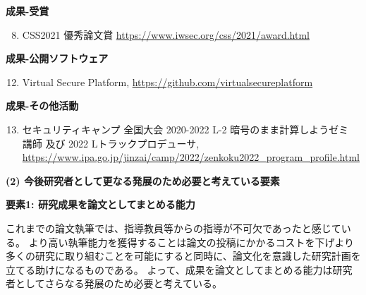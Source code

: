 \noindent\textbf{成果-受賞}
\begin{enumerate}[leftmargin=0.5cm]
    \setcounter{enumi}{7}
    \setlength{\parskip}{0cm} %
    \setlength{\itemsep}{0cm} %
	\label{achieve:mitou}
	\label{achieve:nhk}
	\label{achieve:vsp}
	\item CSS2021 優秀論文賞 \url{https://www.iwsec.org/css/2021/award.html} \label{achieve:css}
\end{enumerate}


\noindent\textbf{成果-公開ソフトウェア}
\begin{enumerate}[leftmargin=0.5cm]
    \setcounter{enumi}{11}
    \setlength{\parskip}{0cm} %
    \setlength{\itemsep}{0cm} %
	\item Virtual Secure Platform, \url{https://github.com/virtualsecureplatform}\label{code:vsp}
\end{enumerate}

\noindent\textbf{成果-その他活動}

\begin{enumerate}[leftmargin=0.5cm]
    \setcounter{enumi}{12}
	\item セキュリティキャンプ 全国大会 2020-2022 L-2 暗号のまま計算しようゼミ 講師 及び 2022 Lトラックプロデューサ, \url{https://www.ipa.go.jp/jinzai/camp/2022/zenkoku2022_program_profile.html}\label{achieve:seccamp}
\end{enumerate}

\vspace{5mm}
\noindent\textbf{(2) 今後研究者として更なる発展のため必要と考えている要素}



\noindent\textbf{要素1: 研究成果を論文としてまとめる能力}

これまでの論文執筆では、指導教員等からの指導が不可欠であったと感じている。
より高い執筆能力を獲得することは論文の投稿にかかるコストを下げより多くの研究に取り組むことを可能にすると同時に、論文化を意識した研究計画を立てる助けになるものである。
よって、成果を論文としてまとめる能力は研究者としてさらなる発展のため必要と考えている。

